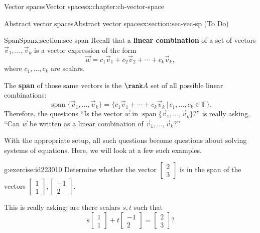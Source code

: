 \documentclass[oneside,10pt,]{book}
\newcommand{\terminology}[1]{\textbf{#1}}
\numberwithin{equation}{section}
\newcommand{\spn}{\operatorname{span}}
\newcommand{\bbm}{\begin{bmatrix}}
\newcommand{\ebm}{\end{bmatrix}}
\begin{document}
%
%
\typeout{************************************************}
\typeout{************************************************}
%
\begin{chapterptx}{Vector spaces}{}{Vector spaces}{}{}{x:chapter:ch-vector-space}
%
%
\typeout{************************************************}
\typeout{************************************************}
%
\begin{sectionptx}{Abstract vector spaces}{}{Abstract vector spaces}{}{}{x:section:sec-vec-sp}
(To Do)%
\end{sectionptx}
%
%
\typeout{************************************************}
\typeout{************************************************}
%
\begin{sectionptx}{Span}{}{Span}{}{}{x:section:sec-span}
Recall that a \terminology{linear combination} of a set of vectors \(\vec{v}_1,\ldots, \vec{v}_k\) is a vector expression of the form%
\begin{equation*}
\vec{w}=c_1\vec{v}_1+c_2\vec{v}_2+\cdots +c_k\vec{v}_k,
\end{equation*}
where \(c_1,\ldots, c_k\) are scalars.%
\par
The \terminology{span} of those same vectors is the $\rank A$ set of all possible linear combinations:%
\begin{equation*}
\spn\{\vec{v}_1,\ldots, \vec{v}_k\} = \{c_1\vec{v}_1+ \cdots + c_k\vec{v}_k \,|\, c_1,\ldots, c_k \in \mathbb{F}\}.
\end{equation*}
Therefore, the questions ``Is the vector \(\vec{w}\) in \(\spn\{\vec{v}_1,\ldots, \vec{v}_k\}\)?'' is really asking, ``Can \(\vec{w}\) be written as a linear combination of \(\vec{v}_1,\ldots, \vec{v}_k\)?''%
\par
With the appropriate setup, all such questions become questions about solving systems of equations. Here, we will look at a few such examples.%
\begin{inlineexercise}{}{g:exercise:id223010}%
Determine whether the vector \(\bbm 2\\3\ebm\) is in the span of the vectors \(\bbm 1\\1\ebm,\bbm -1\\2\ebm\).%
\end{inlineexercise}
This is really asking: are there scalars \(s,t\) such that%
\begin{equation*}
s\bbm 1\\1\ebm + t\bbm -1\\2\ebm = \bbm 2\\3\ebm\text{?}

\end{equation*}
\end{sectionptx}
\end{chapterptx}
\end{document}
